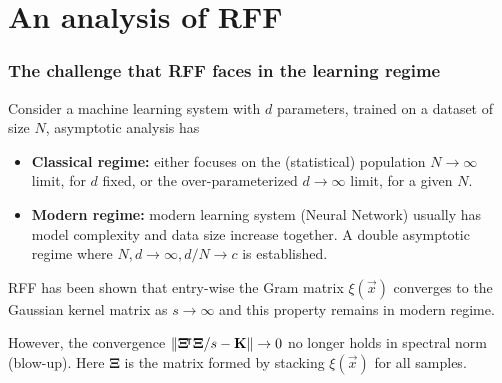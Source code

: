 \documentclass[10pt]{../formats/RU}
\begin{document}
\section{An analysis of RFF}
\begin{frame}
  \frametitle{The challenge that RFF faces in the learning regime}
  Consider a machine learning system with $d$ parameters, trained on a dataset of size $N$, asymptotic analysis has
  \begin{itemize}
    \item \textbf{Classical regime:} either focuses on the (statistical) population $N\rightarrow\infty$ limit, for $d$ fixed, or the over-parameterized $d\rightarrow\infty$ limit, for a given $N$.
    \item \textbf{Modern regime:} modern learning system (\eg Neural Network) usually has model complexity and data size increase together. A double asymptotic regime where $N, d\rightarrow\infty, d/N\rightarrow c$ is established.
  \end{itemize}
  RFF has been shown that entry-wise the Gram matrix $\xi(\vec{x})$ converges to the Gaussian kernel matrix as $s\rightarrow\infty$ and this property remains in modern regime.

  However, the convergence $\lVert\mathbf{\Xi}{}^{\mkern-4mu\intercal}\mathbf{\Xi}/s-\mathbf{K}\rVert\rightarrow 0$ no longer holds in spectral norm (blow-up). Here $\mathbf{\Xi}$ is the matrix formed by stacking $\xi(\vec{x})$ for all samples.
\end{frame}
\end{document}
